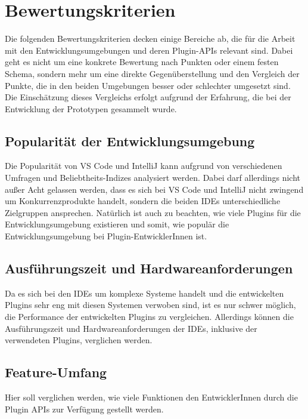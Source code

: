 \chapter{Bewertungskriterien}
\label{cha:Kriterien}

Die folgenden Bewertungskriterien decken einige Bereiche ab,
die für die Arbeit mit den Entwicklungsumgebungen
und deren Plugin-APIs relevant sind. Dabei geht es nicht um eine 
konkrete Bewertung nach Punkten oder einem festen Schema, sondern mehr
um eine direkte Gegenüberstellung und den Vergleich der Punkte,
die in den beiden Umgebungen besser oder schlechter 
umgesetzt sind. 
Die Einschätzung dieses Vergleichs erfolgt aufgrund der Erfahrung, 
die bei der Entwicklung der Prototypen gesammelt wurde.

\section{Popularität der Entwicklungsumgebung} 
\label{sec:Kriterien_Popularität}    
Die Popularität von VS Code und IntelliJ kann aufgrund
von verschiedenen Umfragen und Beliebtheits-Indizes 
analysiert werden. Dabei darf allerdings nicht außer
Acht gelassen werden, dass es sich bei VS Code und
IntelliJ nicht zwingend um Konkurrenzprodukte handelt,
sondern die beiden IDEs unterschiedliche Zielgruppen ansprechen.
Natürlich ist auch zu beachten, wie viele Plugins 
für die Entwicklungsumgebung existieren und somit, wie 
populär die Entwicklungsumgebung bei Plugin-EntwicklerInnen ist. 

\section{Ausführungszeit und Hardwareanforderungen} 
\label{sec:Kriterien_Performance}    
Da es sich bei den IDEs um komplexe Systeme handelt und die 
entwickelten Plugins sehr eng mit diesen Systemen verwoben sind,
ist es nur schwer möglich, die Performance der entwickelten
Plugins zu vergleichen. Allerdings können die Ausführungszeit und Hardwareanforderungen 
der IDEs, inklusive der verwendeten Plugins, verglichen werden.

\section{Feature-Umfang} 
\label{sec:Kriterien_FeatureUmfang}    
Hier soll verglichen werden, wie viele Funktionen
den EntwicklerInnen durch die Plugin APIs 
zur Verfügung gestellt werden.

